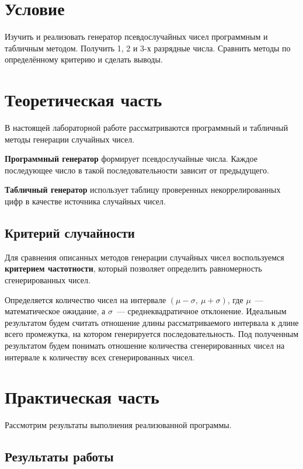 \chapter{Условие}%
\label{cha:uslovie}

Изучить и реализовать генератор псевдослучайных чисел программным и табличным методом. Получить 1, 2 и 3-х разрядные числа. Сравнить методы по определённому критерию и сделать выводы.

\chapter{Теоретическая часть}%
\label{cha:teoreticheskaia_chast_}

В настоящей лабораторной работе рассматриваются программный и табличный методы генерации случайных чисел.

\textbf{Программный генератор} формирует псевдослучайные числа. Каждое последующее число в такой последовательности зависит от предыдущего.

\textbf{Табличный генератор} использует таблицу проверенных некоррелированных цифр в качестве источника случайных чисел.

\section{Критерий случайности}%
\label{sec:kriterii_sluchainosti}

Для сравнения описанных методов генерации случайных чисел воспользуемся \textbf{критерием частотности}, который позволяет определить равномерность сгенерированных чисел.

Определяется количество чисел на интервале $(\mu - \sigma,\ \mu + \sigma)$, где $\mu$~--- математическое ожидание, а $\sigma$~--- среднеквадратичное отклонение. Идеальным результатом будем считать отношение длины рассматриваемого интервала к длине всего промежутка, на котором генерируется последовательность. Под полученным результатом будем понимать отношение количества сгенерированных чисел на интервале к количеству всех сгенерированных чисел.

\chapter{Практическая часть}%
\label{cha:prakticheskaia_chast_}

Рассмотрим результаты выполнения реализованной программы.

\section{Результаты работы}%
\label{sec:rezul_taty_raboty}

